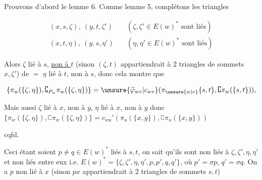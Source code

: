 
Prouvons d'abord le lemme 6. Comme  lemme 5, complétons les triangles

\[
\begin{aligned}
(x,s,\zeta),\ (y,t,\zeta')&\quad(\zeta,\zeta'\in E(w)^*\text{ sont liés})\\
(x,t,\eta),\ (y,s,\eta')&\quad(\eta,\eta'\in E(w)^*\text{ sont liés})
\end{aligned}
\]

Alors $\zeta$ lié à $s$, \uline{non à $t$} (sinon $(\zeta,t)$ appartiendrait à 2 triangles de sommets $x,\zeta'$) de $=$ $\eta$ lié à $t$, non à $s$, donc cela montre que

\[
\{\pi_w(\{\zeta,\eta\}),\complement_{P_w}\pi_w(\{\zeta,\eta\})\}
=\unsure{\widetilde\varphi_{wv}|c_{wv}}(\pi_{\unsure{w|v}}\{s,t\},\complement\pi_w(\{s,t\})),
\]

Mais aussi $\zeta$ lié à $x$, non à $y$, $\eta$ lié à $x$, non à $y$ donc $\{\pi_w(\{\zeta,\eta\}),\complement\pi_w(\{\zeta,\eta\})\}=c_{wu}'(\pi_u(\{x,y\}),\complement\pi_u(\{x,y\}))$

cqfd.

Ceci étant soient $p\ne q\in E(w)^*$ liés à $s,t$, on sait  qu'ils sont non liés à $\zeta,\zeta',\eta,\eta'$ et non liés entre eux i.e. $E(w)^*=\{\zeta,\zeta',\eta,\eta',p,p',q,q'\}$, où $p'=\sigma p$, $q'=\sigma q$. On a $p$ non lié à $x$ (sinon $px$ appartiendrait à 2 triangles de sommets $s,t$)

